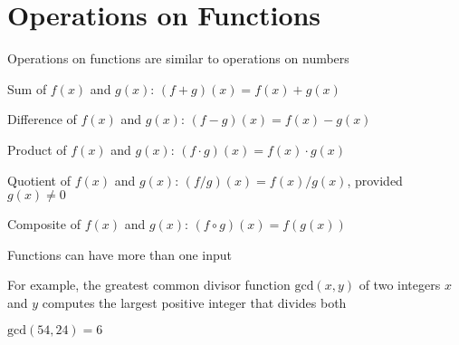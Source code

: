 \documentclass[8pt,a4paper,compress]{beamer}
\begin{document}
\section{Operations on Functions}
\begin{frame}[fragile]
\pause\transdissolve

Operations on functions are similar to operations on numbers

\pause\transdissolve\bigskip

Sum of $f(x)$ and $g(x)$: $(f + g)(x) = f(x) + g(x)$

\pause\transdissolve\bigskip

Difference of $f(x)$ and $g(x)$: $(f - g)(x) = f(x) - g(x)$

\pause\transdissolve\bigskip

Product of $f(x)$ and $g(x)$: $(f \cdot g)(x) = f(x) \cdot g(x)$

\pause\transdissolve\bigskip

Quotient of $f(x)$ and $g(x)$: $(f / g)(x) = f(x) / g(x)$, provided $g(x) \neq 0$

\pause\transdissolve\bigskip

Composite of $f(x)$ and $g(x)$: $(f \circ g)(x) = f(g(x))$

\begin{center}
\end{center}
\end{frame}

\begin{frame}[fragile]
\pause\transdissolve

Functions can have more than one input

\pause\transdissolve\bigskip

For example, the greatest common divisor function $\text{gcd}(x, y)$ of two integers $x$ and $y$ computes the largest positive integer that divides both

\pause\transdissolve\bigskip

$\text{gcd}(54, 24) = 6$
\end{frame}
\end{document}
